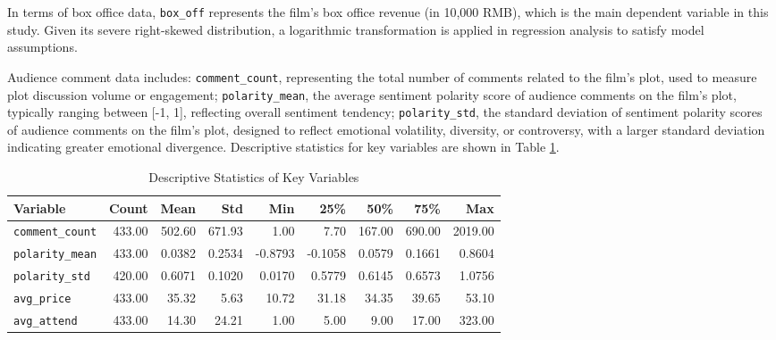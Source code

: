 \documentclass{article}
\begin{document}
In terms of box office data, \texttt{box\_off} represents the film's box office revenue (in 10,000 RMB), which is the main dependent variable in this study. Given its severe right-skewed distribution, a logarithmic transformation is applied in regression analysis to satisfy model assumptions.

Audience comment data includes: \texttt{comment\_count}, representing the total number of comments related to the film's plot, used to measure plot discussion volume or engagement; \texttt{polarity\_mean}, the average sentiment polarity score of audience comments on the film's plot, typically ranging between [-1, 1], reflecting overall sentiment tendency; \texttt{polarity\_std}, the standard deviation of sentiment polarity scores of audience comments on the film's plot, designed to reflect emotional volatility, diversity, or controversy, with a larger standard deviation indicating greater emotional divergence. Descriptive statistics for key variables are shown in Table \ref{tab:descriptive_stats}.

\begin{table}[h!]
\centering
\caption{Descriptive Statistics of Key Variables}
\label{tab:descriptive_stats}
\begin{tabular}{lrrrrrrrr}
\toprule
\textbf{Variable} & \textbf{Count} & \textbf{Mean} & \textbf{Std} & \textbf{Min} & \textbf{25\%} & \textbf{50\%} & \textbf{75\%} & \textbf{Max} \\
 \midrule
\texttt{comment\_count} & 433.00 & 502.60 & 671.93 & 1.00 & 7.70 & 167.00 & 690.00 & 2019.00 \\
\texttt{polarity\_mean} & 433.00 & 0.0382 & 0.2534 & -0.8793 & -0.1058 & 0.0579 & 0.1661 & 0.8604 \\
\texttt{polarity\_std} & 420.00 & 0.6071 & 0.1020 & 0.0170 & 0.5779 & 0.6145 & 0.6573 & 1.0756 \\
\texttt{avg\_price} & 433.00 & 35.32 & 5.63 & 10.72 & 31.18 & 34.35 & 39.65 & 53.10 \\
\texttt{avg\_attend} & 433.00 & 14.30 & 24.21 & 1.00 & 5.00 & 9.00 & 17.00 & 323.00 \\
\bottomrule
\end{tabular}
\end{table}
\end{document}
